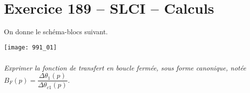 \section*{Exercice 189 -- SLCI -- Calculs}
\setcounter{exo}{0}

On donne le schéma-blocs suivant.
\begin{center}
\texttt{[image: 991\_01]}
\end{center}


\subparagraph{}
\textit{Exprimer la fonction de transfert en boucle fermée, sous forme canonique, notée $B_F(p)=\dfrac{\Delta \theta_1(p)}{\Delta \theta_{c1}(p)}$.}
\ifprof
\begin{corrige}
\end{corrige}
\else
\fi

